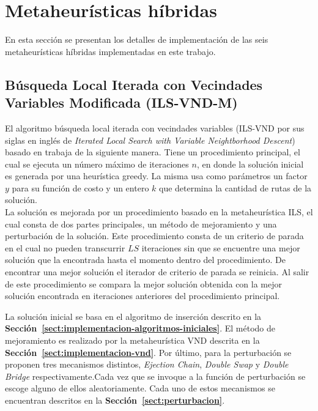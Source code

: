 \section{Metaheurísticas híbridas} \label{sect:implementacion-heuristicas-hibridas}

En esta sección se presentan los detalles de implementación de las seis metaheurísticas híbridas implementadas en este trabajo.

\subsection{Búsqueda Local Iterada con Vecindades Variables Modificada (ILS-VND-M)} \label{sect:implementacion-ils}

El algoritmo búsqueda local iterada con vecindades variables (ILS-VND por sus siglas en inglés de \emph{Iterated Local Search with Variable Neightborhood Descent}) basado en \cite{ils-vnd} trabaja de la siguiente manera. Tiene un procedimiento principal, el cual se ejecuta un número máximo de iteraciones $n$, en donde la solución inicial es generada por una heurística greedy. La misma usa como parámetros un factor $y$ para su función de costo y un entero $k$ que determina la cantidad de rutas de la solución. \\

La solución es mejorada por un procedimiento basado en la metaheurística ILS, el cual consta de dos partes principales, un método de mejoramiento y una perturbación de la solución. Este procedimiento consta de un criterio de parada en el cual no pueden transcurrir $LS$ iteraciones sin que se encuentre una mejor solución que la encontrada hasta el momento dentro del procedimiento. De encontrar una mejor solución el iterador de criterio de parada se reinicia. Al salir de este procedimiento se compara la mejor solución obtenida con la mejor solución encontrada en iteraciones anteriores del procedimiento principal.

La solución inicial se basa en el algoritmo de inserción descrito en la \textbf{Sección~\ref{sect:implementacion-algoritmos-iniciales}}. El método de mejoramiento es realizado por la metaheurística VND descrita en la \textbf{Sección~\ref{sect:implementacion-vnd}}. Por último, para la perturbación se proponen tres mecanismos distintos, \textit{Ejection Chain}, \textit{Double Swap} y \textit{Double Bridge} respectivamente.Cada vez que se invoque a la función de perturbación se escoge alguno de ellos aleatoriamente. Cada uno de estos mecanismos se encuentran descritos en la \textbf{Sección~\ref{sect:perturbacion}}.\\

